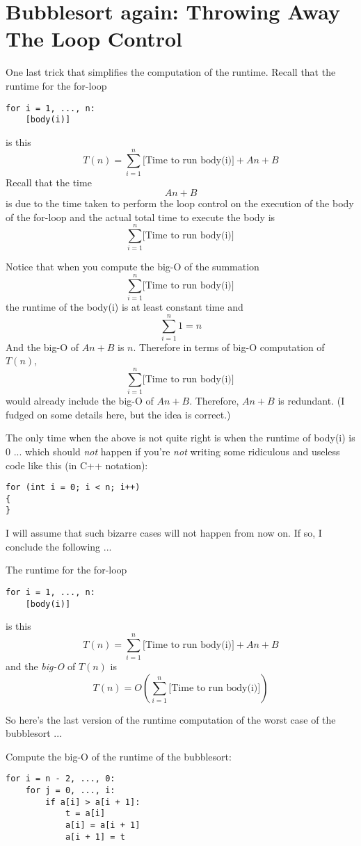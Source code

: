 \section{Bubblesort again: Throwing Away The Loop Control}

One last trick that simplifies the computation of the runtime.
Recall that the runtime for the for-loop
\begin{Verbatim}[frame=single,fontsize=\footnotesize]
for i = 1, ..., n:
    [body(i)]
\end{Verbatim}
is this
\[
T(n) = \sum_{i=1}^n \text{[Time to run body(i)]} + An + B
\]
Recall that the time
\[
An + B
\]
is due to the time taken to perform the loop control on
the execution of the body of the for-loop
and the actual total time to execute the body is
\[
\sum_{i=1}^n \text{[Time to run body(i)]}
\]

Notice that when you compute the big-O of the summation
\[
\sum_{i=1}^n \text{[Time to run body(i)]}
\]
the runtime of the body(i) is at least constant time and 
\[
\sum_{i=1}^n 1 = n
\]
And the big-O of $An + B$ is $n$.
Therefore in terms of big-O computation of $T(n)$,
\[
\sum_{i=1}^n \text{[Time to run body(i)]}
\]
would already include the big-O of $An + B$.
Therefore, $An + B$ is redundant.
(I fudged on some details here, but the idea is correct.)

The only time when the above is not quite right is when the runtime
of body(i) is 0 ... which should \textit{not} happen if you're \textit{not} writing
some ridiculous and useless code like this (in C++ notation):
\begin{Verbatim}[frame=single,fontsize=\footnotesize]
for (int i = 0; i < n; i++)
{
}
\end{Verbatim}
I will assume that such bizarre cases will not happen from now on.
If so, I conclude the following ...

The runtime for the for-loop
\begin{Verbatim}[frame=single,fontsize=\footnotesize]
for i = 1, ..., n:
    [body(i)]
\end{Verbatim}
is this
\[
T(n) = \sum_{i=1}^n \text{[Time to run body(i)]} + An + B
\]
and the \textit{big-O} of $T(n)$ is
\[
T(n) = 
O
\left(
\sum_{i=1}^n \text{[Time to run body(i)]}
\right)
\]

So here's the last version of the runtime computation of the 
worst case of the bubblesort ...

\newpage

\begin{eg}
Compute the big-O of the runtime of the bubblesort:
\begin{Verbatim}[frame=single,fontsize=\footnotesize]
for i = n - 2, ..., 0:
    for j = 0, ..., i:
        if a[i] > a[i + 1]:
            t = a[i]
            a[i] = a[i + 1]
            a[i + 1] = t
\end{Verbatim}
\end{eg}

